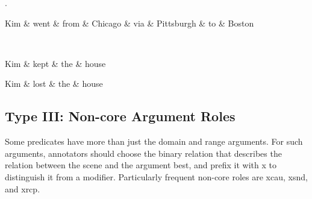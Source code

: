 \documentclass[a4paper]{article}
\begin{document}
\ex.
\begin{dependency}
    \begin{deptext}
    Kim \& went \& from \& Chicago \& via \& Pittsburgh \& to \& Boston \\
    \end{deptext}
\end{dependency}\\
\begin{dependency}
    \begin{deptext}
    Kim \& kept \& the \& house \\
    \end{deptext}
\end{dependency}
\begin{dependency}
    \begin{deptext}
    Kim \& lost \& the \& house \\
    \end{deptext}
\end{dependency}

\subsection{Type III: Non-core Argument Roles}

Some predicates have more than just the domain and range arguments. For such arguments, annotators should choose the binary relation that describes the relation between the scene and the argument best, and prefix it with \textsf{x} to distinguish it from a modifier. Particularly frequent non-core roles are \textsf{xcau}, \textsf{xsnd}, and \textsf{xrcp}.
\end{document}

